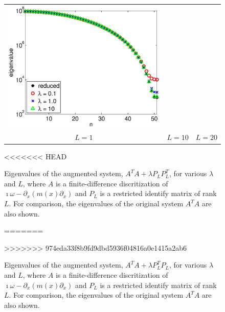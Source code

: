 \documentclass{iopart}
\begin{document}
{\begin{figure}
\begin{tabular}{ccc}
\includegraphics[scale=.2]{./figs/example2_c}\\
{\small $L = 1$}&{\small $L = 10$}&{\small $L = 20$}\\
\end{tabular}
<<<<<<< HEAD
\caption{Eigenvalues of the augmented system,  $A^TA + \lambda P_LP_L^T$, for various $\lambda$ and $L$, where $A$ is a finite-difference discritization of $\imath\omega - \partial_x\left(m(x)\partial_x\right)$
and $P_L$ is a restricted identify matrix of rank $L$. For comparison, the eigenvalues of the original system $A^TA$ are also shown.}
=======
\caption{Eigenvalues of the augmented system,  $A^T\!A + \lambda P_L^T\!P_L$, for various $\lambda$ and $L$, where $A$ is a finite-difference discritization of $\imath\omega - \partial_x\left(m(x)\partial_x\right)$
and $P_L$ is a restricted identify matrix of rank $L$. For comparison, the eigenvalues of the original system $A^T\!A$ are also shown.}
>>>>>>> 974eda33f8b9fd9dbd5936f04816a0e1415a2ab6
\label{fig:example2}
\end{figure}

}
\end{document}
